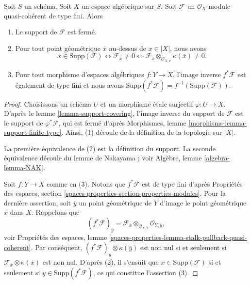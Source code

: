 \begin{lemma}
\label{lemma-support-finite-type}
Soit $S$ un schéma. Soit $X$ un espace algébrique sur $S$.
Soit $\mathcal{F}$ un $\mathcal{O}_X$-module quasi-cohérent de type fini.
Alors
\begin{enumerate}
\item Le support de $\mathcal{F}$ est fermé.
\item Pour tout point géométrique $\overline{x}$ au-dessus de $x \in |X|$, nous avons
$$
x \in \text{Supp}(\mathcal{F})
\Leftrightarrow
\mathcal{F}_{\overline{x}} \not = 0
\Leftrightarrow
\mathcal{F}_{\overline{x}} \otimes_{\mathcal{O}_{X, \overline{x}}}
\kappa(\overline{x}) \not = 0.
$$
\item Pour tout morphisme d'espaces algébriques $f : Y \to X$, l'image inverse
$f^*\mathcal{F}$ est également de type fini et nous avons
$\text{Supp}(f^*\mathcal{F}) = f^{-1}(\text{Supp}(\mathcal{F}))$.
\end{enumerate}
\end{lemma}

\begin{proof}
Choisissons un schéma $U$ et un morphisme étale surjectif $\varphi : U \to X$.
D'après le lemme \ref{lemma-support-covering}, l'image inverse du support de
$\mathcal{F}$ est le support de $\varphi^*\mathcal{F}$, qui est fermé d'après
Morphismes, lemme \ref{morphisms-lemma-support-finite-type}.
Ainsi, (1) découle de la définition de la topologie sur $|X|$.

\medskip\noindent
La première équivalence de (2) est la définition du support.
La seconde équivalence découle du lemme de Nakayama ; voir
Algèbre, lemme \ref{algebra-lemma-NAK}.

\medskip\noindent
Soit $f : Y \to X$ comme en (3). Notons que $f^*\mathcal{F}$ est de type fini
d'après Propriétés des espaces, section
\ref{spaces-properties-section-properties-modules}.
Pour la dernière assertion, soit $\overline{y}$ un point géométrique de $Y$
d'image le point géométrique $\overline{x}$ dans $X$. Rappelons que
$$
(f^*\mathcal{F})_{\overline{y}} =
\mathcal{F}_{\overline{x}} \otimes_{\mathcal{O}_{X, \overline{x}}}
\mathcal{O}_{Y, \overline{y}},
$$
voir Propriétés des espaces, lemme
\ref{spaces-properties-lemma-stalk-pullback-quasi-coherent}.
Par conséquent, $(f^*\mathcal{F})_{\overline{y}} \otimes \kappa(\overline{y})$
est non nul si et seulement si
$\mathcal{F}_{\overline{x}} \otimes \kappa(\overline{x})$ est non nul.
D'après (2), il s'ensuit que $x \in \text{Supp}(\mathcal{F})$ si et seulement
si $y \in \text{Supp}(f^*\mathcal{F})$, ce qui constitue
l'assertion (3).
\end{proof}

